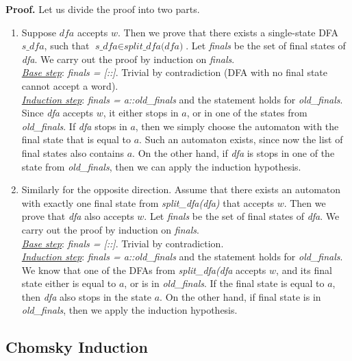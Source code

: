 \textbf{Proof.}
Let us divide the proof into two parts.
\begin{enumerate}
\item Suppose $\textit{dfa}$ accepts $w$. Then we prove that there exists a single-state DFA $\textit{s\_dfa}$, such that $\textit{s\_dfa} \in \textit{split\_dfa(dfa)}$. 
Let \textit{finals} be the set of final states of \textit{dfa}. We carry out the proof by induction on \textit{finals}. 
\\
\textit{\underline{Base step}}: \textit{finals = [::]}. Trivial by contradiction (DFA with no final state cannot accept a word).
\\
\textit{\underline{Induction step}}: \textit{finals = a::old\_finals} and the statement holds for \textit{old\_finals}. Since \textit{dfa} accepts $w$, it either stops in $a$, or in one of the states from \textit{old\_finals}.
If \textit{dfa} stops in $a$, then we simply choose the automaton with the final state that is equal to $a$.
Such an automaton exists, since now the list of final states also contains $a$.
On the other hand, if \textit{dfa} is stops in one of the state from \textit{old\_finals}, then we can apply the induction hypothesis.

\item Similarly for the opposite direction. Assume that there exists an automaton with exactly one final state from \textit{split\_dfa(dfa)} that accepts $w$. Then we prove that \textit{dfa} also accepts $w$. 
Let \textit{finals} be the set of final states of \textit{dfa}. We carry out the proof by induction on \textit{finals}. 
\\
\textit{\underline{Base step}}: \textit{finals = [::]}. Trivial by contradiction.
\\
\textit{\underline{Induction step}}: \textit{finals = a::old\_finals} and the statement holds for \textit{old\_finals}.
We know that one of the DFAs from \textit{split\_dfa(dfa} accepts $w$, and its final state either is equal to $a$, or is in \textit{old\_finals}.
If the final state is equal to $a$, then \textit{dfa} also stops in the state $a$.
On the other hand, if final state is in \textit{old\_finals}, then we apply the induction hypothesis.
\end{enumerate}


\subsection{Chomsky Induction}
\label{sec:chomsky-induction}

